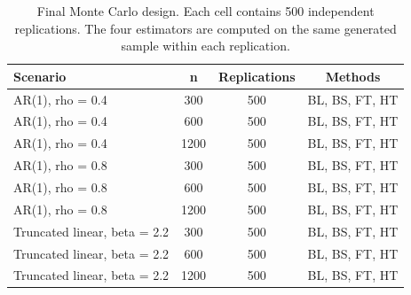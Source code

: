 \begin{table}[!htbp]
\small
\centering
\caption{Final Monte Carlo design. Each cell contains 500 independent replications. The four estimators are computed on the same generated sample within each replication.}
\label{tab:simulation-design}
\begin{tabular}{lccc}
\toprule
Scenario & n & Replications & Methods \\
\midrule
AR(1), rho = 0.4 & 300 & 500 & BL, BS, FT, HT \\
AR(1), rho = 0.4 & 600 & 500 & BL, BS, FT, HT \\
AR(1), rho = 0.4 & 1200 & 500 & BL, BS, FT, HT \\
AR(1), rho = 0.8 & 300 & 500 & BL, BS, FT, HT \\
AR(1), rho = 0.8 & 600 & 500 & BL, BS, FT, HT \\
AR(1), rho = 0.8 & 1200 & 500 & BL, BS, FT, HT \\
Truncated linear, beta = 2.2 & 300 & 500 & BL, BS, FT, HT \\
Truncated linear, beta = 2.2 & 600 & 500 & BL, BS, FT, HT \\
Truncated linear, beta = 2.2 & 1200 & 500 & BL, BS, FT, HT \\
\bottomrule
\end{tabular}
\end{table}
